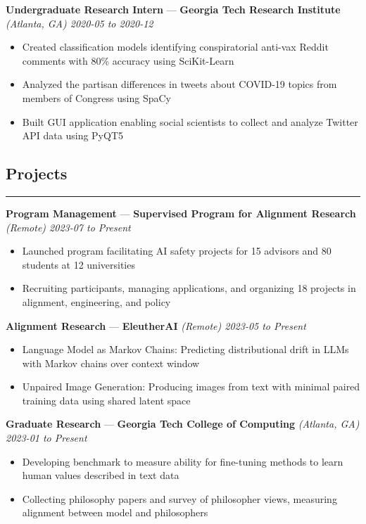 \documentclass[10pt]{article}
\newcommand{\resumeHeading}[1]{
    \subsection*{#1}
    \hrule
    \vspace*{5pt}
}
\newcommand{\resumeSubHeading}[5]{
    \vspace*{5pt}
    \textbf{#1} — \textbf{#2} \textsl{(#3) \hfill #4 to #5}
}
\begin{document}
\resumeSubHeading
    {Undergraduate Research Intern}
    {Georgia Tech Research Institute}
    {Atlanta, GA}
    {2020-05}
    {2020-12}
\begin{itemize}
    \item Created classification models identifying conspiratorial anti-vax Reddit comments with 80\% accuracy using SciKit-Learn
    \item Analyzed the partisan differences in tweets about COVID-19 topics from members of Congress using SpaCy
    \item Built GUI application enabling social scientists to collect and analyze Twitter API data using PyQT5
\end{itemize}



\resumeHeading{Projects \vspace{-2.5pt}}

\resumeSubHeading
    {Program Management}
    {Supervised Program for Alignment Research}
    {Remote}
    {2023-07}
    {Present}
\begin{itemize}
    \item Launched program facilitating AI safety projects for 15 advisors and 80 students at 12 universities
    \item Recruiting participants, managing applications, and organizing 18 projects in alignment, engineering, and policy
\end{itemize}

\resumeSubHeading
{Alignment Research}
{EleutherAI}
{Remote}
{2023-05}
{Present}
\begin{itemize}
    \item Language Model as Markov Chains: Predicting distributional drift in LLMs with Markov chains over context window
    \item Unpaired Image Generation: Producing images from text with minimal paired training data using shared latent space
\end{itemize}

\resumeSubHeading
    {Graduate Research}
    {Georgia Tech College of Computing}
    {Atlanta, GA}
    {2023-01}
    {Present}
\begin{itemize}
    \item Developing benchmark to measure ability for fine-tuning methods to learn human values described in text data
    \item Collecting philosophy papers and survey of philosopher views, measuring alignment between model and philosophers
\end{itemize}
\end{document}
